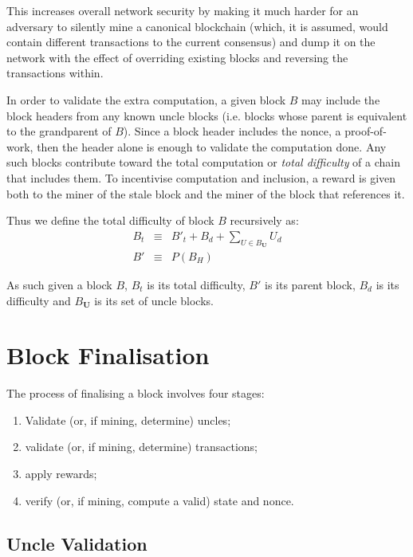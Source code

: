 \documentclass[9pt,oneside]{amsart}
\begin{document}
\begin{multicols}{2}
This increases overall network security by making it much harder for an adversary to silently mine a canonical blockchain (which, it is assumed, would contain different transactions to the current consensus) and dump it on the network with the effect of overriding existing blocks and reversing the transactions within.

In order to validate the extra computation, a given block $B$ may include the block headers from any known uncle blocks (i.e. blocks whose parent is equivalent to the grandparent of $B$). Since a block header includes the nonce, a proof-of-work, then the header alone is enough to validate the computation done. Any such blocks contribute toward the total computation or \textit{total difficulty} of a chain that includes them. To incentivise computation and inclusion, a reward is given both to the miner of the stale block and the miner of the block that references it.

Thus we define the total difficulty of block $B$ recursively as:
\begin{eqnarray}
B_t & \equiv & B'_t + B_d + \sum\limits_{U \in B_\mathbf{U}} U_d \\
B' & \equiv & P(B_H)
\end{eqnarray}

As such given a block $B$, $B_t$ is its total difficulty, $B'$ is its parent block, $B_d$ is its difficulty and $B_\mathbf{U}$ is its set of uncle blocks.

\section{Block Finalisation} \label{ch:finalisation}

The process of finalising a block involves four stages:

\begin{enumerate}
\item Validate (or, if mining, determine) uncles;
\item validate (or, if mining, determine) transactions;
\item apply rewards;
\item verify (or, if mining, compute a valid) state and nonce.
\end{enumerate}

\subsection{Uncle Validation}


\end{multicols}
\end{document}
